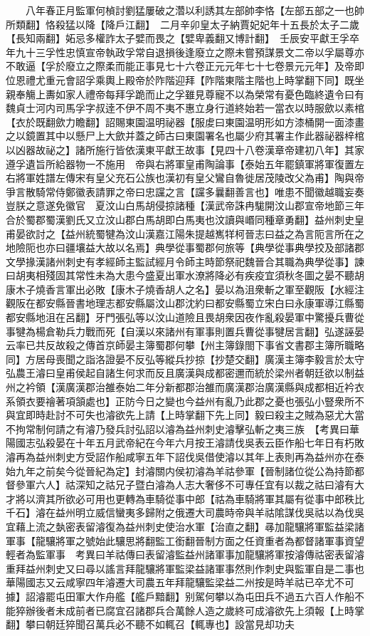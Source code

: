 　　八年春正月監軍何楨討劉猛屢破之濳以利誘其左部帥李恪【左部五部之一也帥所類翻】恪殺猛以降【降戶江翻】　二月辛卯皇太子納賈妃妃年十五長於太子二歲【長知兩翻】妬忌多權詐太子嬖而畏之【嬖卑義翻又博計翻】　壬辰安平獻王孚卒年九十三孚性忠慎宣帝執政孚常自退損後逢廢立之際未嘗預謀景文二帝以孚屬尊亦不敢逼【孚於廢立之際柔而能正事見七十六卷正元元年七十七卷景元元年】及帝即位恩禮尤重元會詔孚乘輿上殿帝於阼階迎拜【阼階東階主階也上時掌翻下同】既坐親奉觴上夀如家人禮帝每拜孚跪而止之孚雖見尊寵不以為榮常有憂色臨終遺令曰有魏貞士河内司馬孚字叔逹不伊不周不夷不惠立身行道終始若一當衣以時服歛以素棺【衣於既翻歛力瞻翻】詔賜東園温明祕器【服䖍曰東園温明形如方漆桶開一面漆畫之以鏡置其中以懸尸上大歛并蓋之師古曰東園署名也屬少府其署主作此器祕器梓棺以凶器故祕之】諸所施行皆依漢東平獻王故事【見四十八卷漢章帝建初八年】其家遵孚遺旨所給器物一不施用　帝與右將軍皇甫陶論事【泰始五年罷鎮軍將軍復置左右將軍姓譜左傳宋有皇父充石公族也漢初有皇父鸞自魯徙居茂陵改父為甫】陶與帝爭言散騎常侍鄭徽表請罪之帝曰忠讜之言【讜多曩翻善言也】唯患不聞徽越職妄奏豈朕之意遂免徽官　夏汶山白馬胡侵掠諸種【漢武帝誅冉駹開汶山郡宣帝地節三年合於蜀郡蜀漢劉氏又立汶山郡白馬胡即白馬夷也汶讀與㟭同種章勇翻】益州刺史皇甫晏欲討之【益州統蜀犍為汶山漢嘉江陽朱提越嶲䍧柯晉志曰益之為言阨言所在之地險阨也亦曰疆壤益大故以名焉】典學從事蜀郡何旅等【典學從事典學挍及部諸郡文學掾漢諸州刺史有孝經師主監試經月令師主時節祭祀魏晉合其職為典學從事】諫曰胡夷相殘固其常性未為大患今盛夏出軍水潦將降必有疾疫宜須秋冬圖之晏不聽胡康木子燒香言軍出必敗【康木子燒香胡人之名】晏以為沮衆斬之軍至觀阪【水經注觀阪在都安縣晉書地理志都安縣屬汶山郡沈約曰都安縣蜀立宋白曰永康軍導江縣蜀都安縣地沮在呂翻】牙門張弘等以汶山道險且畏胡衆因夜作亂殺晏軍中驚擾兵曹從事犍為楊倉勒兵力戰而死【自漢以來諸州有軍事則置兵曹從事犍居言翻】弘遂誣晏云率已共反故殺之傳首京師晏主簿蜀郡何攀【州主簿錄閤下事省文書郡主簿所職略同】方居母喪聞之詣洛證晏不反弘等縱兵抄掠【抄楚交翻】廣漢主簿李毅言於太守弘農王濬曰皇甫侯起自諸生何求而反且廣漢與成都密邇而統於梁州者朝廷欲以制益州之衿領【漢廣漢郡治雒泰始二年分新都郡治雒而廣漢郡治廣漢縣與成都相近衿衣系領衣要禬著項頷處也】正防今日之變也今益州有亂乃此郡之憂也張弘小豎衆所不與宜即時赴討不可失也濬欲先上請【上時掌翻下先上同】毅曰殺主之賊為惡尤大當不拘常制何請之有濬乃發兵討弘詔以濬為益州刺史濬擊弘斬之夷三族　【考異曰華陽國志弘殺晏在十年五月武帝紀在今年六月按王濬請伐吳表云臣作船七年日有朽敗濬再為益州刺史方受詔作船咸寧五年下詔伐吳借使濬以其年上表則再為益州亦在泰始九年之前矣今從晉紀為定】封濬關内侯初濬為羊祜參軍【晉制諸位從公為持節都督參軍六人】祜深知之祜兄子暨白濬為人志大奢侈不可專任宜有以裁之祜曰濬有大才將以濟其所欲必可用也更轉為車騎從事中郎【祜為車騎將軍其屬有從事中郎秩比千石】濬在益州明立威信蠻夷多歸附之俄遷大司農時帝與羊祜隂謀伐吳祜以為伐吳宜藉上流之埶密表留濬復為益州刺史使治水軍【治直之翻】㝷加龍驤將軍監益梁諸軍事【龍驤將軍之號始此驤思將翻監工銜翻晉制方面之任資重者為都督諸軍事資望輕者為監軍事　考異曰羊祜傳曰表留濬監益州諸軍事加龍驤將軍按濬傳祜密表留濬重拜益州刺史又曰尋以謠言拜龍驤將軍監梁益諸軍事然則作刺史與監軍自是二事也華陽國志又云咸寧四年濬遷大司農五年拜龍驤監梁益二州按是時羊祜已卒尤不可據】詔濬罷屯田軍大作舟艦【艦戶黯翻】别駕何攀以為屯田兵不過五六百人作船不能猝辦後者未成前者已腐宜召諸郡兵合萬餘人造之歲終可成濬欲先上須報【上時掌翻】攀曰朝廷猝聞召萬兵必不聽不如輒召【輒專也】設當見却功夫